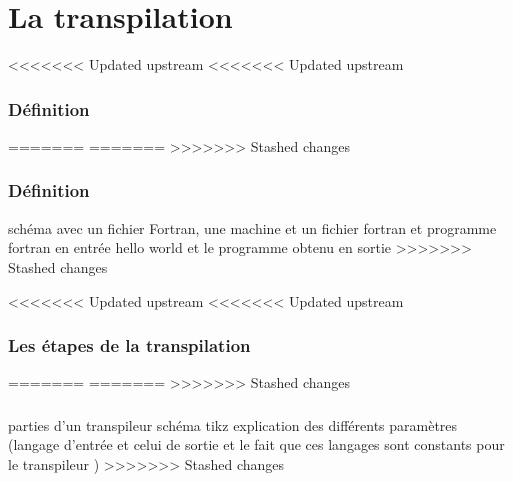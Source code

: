 \section{La transpilation}

\begin{frame}
<<<<<<< Updated upstream
<<<<<<< Updated upstream
    \frametitle{Définition}
    
=======
=======
>>>>>>> Stashed changes
    \frametitle{Définition\esp}
    schéma avec un fichier Fortran, une machine et un fichier fortran
    et 
    programme fortran en entrée hello world et le programme obtenu en sortie 
>>>>>>> Stashed changes
\end{frame}


\begin{frame}
<<<<<<< Updated upstream
<<<<<<< Updated upstream

    \frametitle{Les étapes de la transpilation}

   
=======
=======
>>>>>>> Stashed changes
    \frametitle{\esp}
    parties d'un transpileur
    schéma tikz explication des différents paramètres (langage d'entrée et celui de sortie et le fait que ces langages sont constants pour le transpileur ) 
>>>>>>> Stashed changes
\end{frame}

